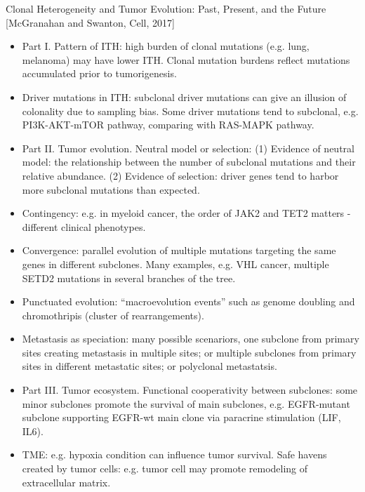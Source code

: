 \documentclass{report}
\begin{document}
Clonal Heterogeneity and Tumor Evolution: Past, Present, and the Future [McGranahan and Swanton, Cell, 2017]
\begin{itemize}
	
	\item Part I. Pattern of ITH: high burden of clonal mutations (e.g. lung, melanoma) may have lower ITH. Clonal mutation burdens reflect mutations accumulated prior to tumorigenesis. 
	
	\item Driver mutations in ITH: subclonal driver mutations can give an illusion of colonality due to sampling bias. Some driver mutations tend to subclonal, e.g. PI3K-AKT-mTOR pathway, comparing with RAS-MAPK pathway. 
	
	\item Part II. Tumor evolution. Neutral model or selection: (1) Evidence of neutral model: the relationship between the number of subclonal mutations and their relative abundance. (2) Evidence of selection: driver genes tend to harbor more subclonal mutations than expected. 
	
	\item Contingency: e.g. in myeloid cancer, the order of JAK2 and TET2 matters - different clinical phenotypes. 
	
	\item Convergence: parallel evolution of multiple mutations targeting the same genes in different subclones. Many examples, e.g. VHL cancer, multiple SETD2 mutations in several branches of the tree. 
	
	\item Punctuated evolution: “macroevolution events” such as genome doubling and chromothripis (cluster of rearrangements).  
	
	\item Metastasis as speciation: many possible scenariors, one subclone from primary sites creating metastasis in multiple sites; or multiple subclones from primary sites in different metastatic sites; or polyclonal metastatsis. 
	
	\item Part III. Tumor ecosystem. Functional cooperativity between subclones: some minor subclones promote the survival of main subclones, e.g. EGFR-mutant subclone supporting EGFR-wt main clone via paracrine stimulation (LIF, IL6). 
	
	\item TME: e.g. hypoxia condition can influence tumor survival. Safe havens created by tumor cells: e.g. tumor cell may promote remodeling of extracellular matrix. 
	

\end{itemize}
\end{document}
